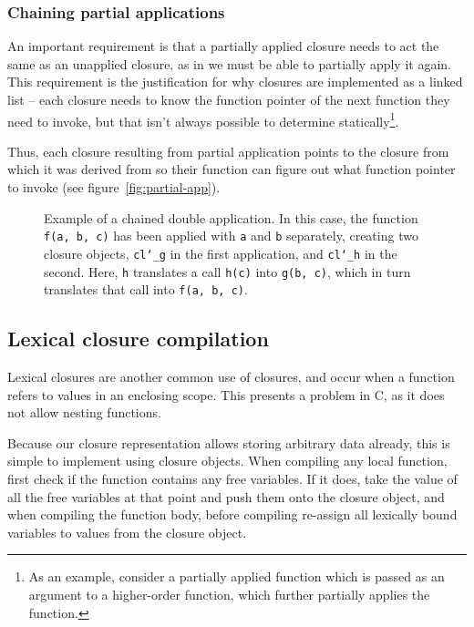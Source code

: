 \subsubsection{Chaining partial applications}

An important requirement is that a partially applied closure needs to act the
same as an unapplied closure, as in we must be able to partially apply it again.
This requirement is the justification for why closures are implemented as 
a linked list -- each closure needs to know the function pointer of the next 
function they need to invoke, but that isn't always possible to determine 
statically\footnote{As an example, consider a partially applied function which 
is passed as an argument to a higher-order function, which further partially 
applies the function.}.

Thus, each closure resulting from partial application points to the closure from
which it was derived from so their function can figure out what function pointer
to invoke (see figure~\ref{fig:partial-app}).

\begin{figure}
    \centering
    
    \caption{Example of a chained double application. In this case, the 
    function \texttt{f(a, b, c)} has been applied with \texttt{a} and 
    \texttt{b} separately, creating two closure objects, \texttt{cl\char`_g} in 
    the first application, and \texttt{cl\char`_h} in the second. Here, 
    \texttt{h} translates a call \texttt{h(c)} into \texttt{g(b, c)}, which in 
    turn translates that call into \texttt{f(a, b, c)}.}
    \label{fig:double-partial-app}
\end{figure}

\subsection{Lexical closure compilation}

Lexical closures are another common use of closures, and occur when a function
refers to values in an enclosing scope. This presents a problem in C, as it does
not allow nesting functions.

Because our closure representation allows storing arbitrary data already, this
is simple to implement using closure objects. When compiling any local function,
first check if the function contains any free variables. If it does, take the
value of all the free variables at that point and push them onto the closure
object, and when compiling the function body, before compiling re-assign all
lexically bound variables to values from the closure object.

